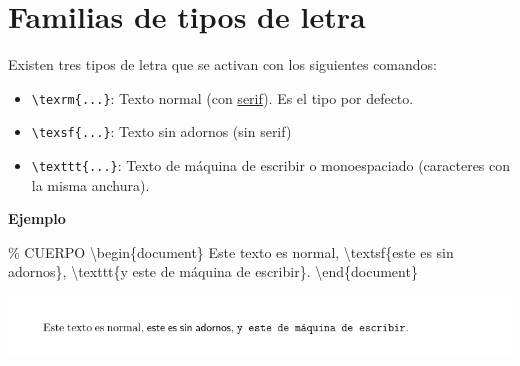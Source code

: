\documentclass[
  a4paper,
]{scrreport}
\newenvironment{Shaded}{\begin{snugshade}}{\end{snugshade}}
\newcommand{\CommentTok}[1]{\textcolor[rgb]{0.37,0.37,0.37}{#1}}
\newcommand{\ExtensionTok}[1]{\textcolor[rgb]{0.00,0.23,0.31}{#1}}
\newcommand{\FunctionTok}[1]{\textcolor[rgb]{0.28,0.35,0.67}{#1}}
\newcommand{\KeywordTok}[1]{\textcolor[rgb]{0.00,0.23,0.31}{#1}}
\newcommand{\NormalTok}[1]{\textcolor[rgb]{0.00,0.23,0.31}{#1}}
\providecommand{\tightlist}{%
  \setlength{\itemsep}{0pt}\setlength{\parskip}{0pt}}\usepackage{longtable,booktabs,array}
\begin{document}
\hypertarget{familias-de-tipos-de-letra}{%
\section{Familias de tipos de letra}\label{familias-de-tipos-de-letra}}

Existen tres tipos de letra que se activan con los siguientes comandos:

\begin{itemize}
\tightlist
\item
  \texttt{\textbackslash{}texrm\{...\}}: Texto normal (con
  \href{https://en.wikipedia.org/wiki/Serif}{serif}). Es el tipo por
  defecto.
\item
  \texttt{\textbackslash{}texsf\{...\}}: Texto sin adornos (sin serif)
\item
  \texttt{\textbackslash{}texttt\{...\}}: Texto de máquina de escribir o
  monoespaciado (caracteres con la misma anchura).
\end{itemize}

\textbf{Ejemplo}

\begin{Shaded}
\begin{Highlighting}[]
\CommentTok{\% CUERPO}
\KeywordTok{\textbackslash{}begin}\NormalTok{\{}\ExtensionTok{document}\NormalTok{\}}
\NormalTok{Este texto es normal, }\FunctionTok{\textbackslash{}textsf}\NormalTok{\{este es sin adornos\}, }\FunctionTok{\textbackslash{}texttt}\NormalTok{\{y este de máquina de escribir\}.}
\KeywordTok{\textbackslash{}end}\NormalTok{\{}\ExtensionTok{document}\NormalTok{\}}
\end{Highlighting}
\end{Shaded}

\begin{tcolorbox}[enhanced jigsaw, bottomrule=.15mm, leftrule=.75mm, opacityback=0, titlerule=0mm, bottomtitle=1mm, colbacktitle=quarto-callout-note-color!10!white, arc=.35mm, toprule=.15mm, colframe=quarto-callout-note-color-frame, title={Salida}, coltitle=black, colback=white, breakable, toptitle=1mm, rightrule=.15mm, left=2mm, opacitybacktitle=0.6]

\includegraphics{./img/formateo/tipos-letra.png}

\end{tcolorbox}
\end{document}
